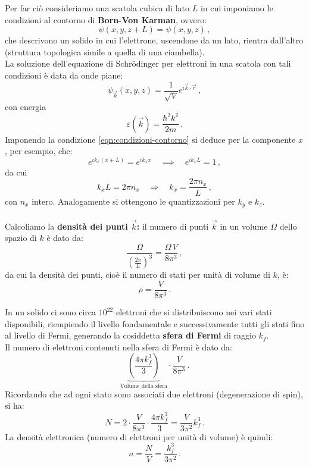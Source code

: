 \bigskip
\noindent
Per far ciò consideriamo una scatola cubica di lato $L$ in cui imponiamo le condizioni al contorno di \textbf{Born-Von Karman}, ovvero:
\begin{equation}
	\psi(x,y,z+L)= \psi(x,y,z)\,,
	\label{eqn:condizioni-contorno}
\end{equation}
che descrivono un solido in cui l'elettrone, uscendone da un lato, rientra dall'altro (struttura topologica simile a quella di una ciambella).\\
La soluzione dell'equazione di Schrödinger per elettroni in una scatola con tali condizioni è data da onde piane:
\[
\psi_{\vec{k}}(x,y,z)= \frac{1}{\sqrt{V}} e^{i\vec{k}\cdot\vec{r}}\,,
\]
con energia
\[
\varepsilon(\vec{k})= \frac{\hbar^2 k^2}{2m}\,.
\]
Imponendo la condizione \eqref{eqn:condizioni-contorno} si deduce per la componente $x$, per esempio, che:
\[
e^{i k_x (x+L)}= e^{i k_x x} \quad \implies \quad e^{i k_x L}= 1\,,
\]
da cui
\[
k_x L= 2\pi n_x \quad \Longrightarrow \quad k_x = \frac{2\pi n_x}{L}\,,
\]
con $n_x$ intero. Analogamente si ottengono le quantizzazioni per $k_y$ e $k_z$.\\\\
Calcoliamo la \textbf{densità dei punti $\vec{k}$:} il numero di punti $\vec{k}$ in un volume $\Omega$ dello spazio di $k$ è dato da:
\[
\frac{\Omega}{\left(\frac{2\pi}{L}\right)^3} = \frac{\Omega\, V}{8\pi^3}\,,
\]
da cui la densità dei punti, cioè il numero di stati per unità di volume di $k$, è:
\begin{equation}
	\rho = \frac{V}{8\pi^3}\,.
	\label{eqn:densita_k}
\end{equation}

\bigskip
\noindent
In un solido ci sono circa $10^{22}$ elettroni che si distribuiscono nei vari stati disponibili, riempiendo il livello fondamentale e successivamente tutti gli stati fino al livello di Fermi, generando la cosiddetta \textbf{sfera di Fermi} di raggio $k_f$. \\
Il numero di elettroni contenuti nella sfera di Fermi è dato da:
\[
\underbrace{\left(\frac{4\pi k_f^3}{3}\right)}_{\text{Volume della sfera}} \cdot \frac{V}{8\pi^3}\,.
\]
Ricordando che ad ogni stato sono associati due elettroni (degenerazione di spin), si ha:
\begin{equation}
	N= 2\cdot \frac{V}{8\pi^3} \cdot \frac{4\pi k_f^3}{3} = \frac{V}{3\pi^2} k_f^3\,.
	\label{eqn:N_V}
\end{equation}
La densità elettronica (numero di elettroni per unità di volume) è quindi:
\[
n= \frac{N}{V}= \frac{k_f^3}{3\pi^2}\,.
\]

